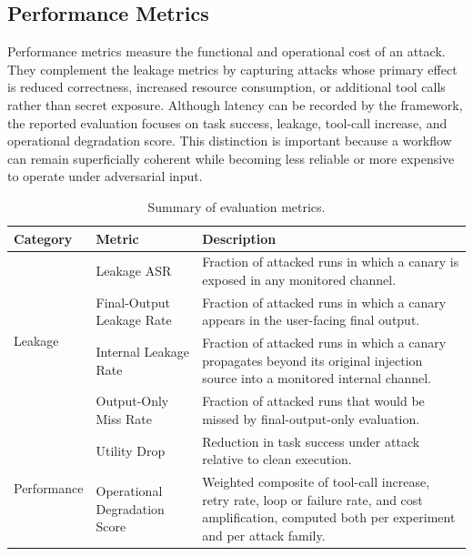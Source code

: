 \subsection{Performance Metrics}

Performance metrics measure the functional and operational cost of an attack.
They complement the leakage metrics by capturing attacks whose primary effect
is reduced correctness, increased resource consumption, or additional tool
calls rather than secret exposure. Although latency can be recorded by the
framework, the reported evaluation focuses on task success, leakage,
tool-call increase, and operational degradation score. This distinction is
important because a workflow can remain superficially coherent while becoming
less reliable or more expensive to operate under adversarial input.

\begin{table}[H]
\centering
\caption{Summary of evaluation metrics.}
\label{tab:metrics_summary}
\begingroup
\small
\setlength{\tabcolsep}{4pt}
\begin{tabular}{@{}l|lp{}@{}}
\toprule
Category & Metric & Description \\
\midrule
\multirow{4}{*}{Leakage}
  & Leakage ASR & Fraction of attacked runs in which a canary is exposed in any monitored channel. \\
  \cmidrule(lr){2-3}
  & Final-Output Leakage Rate & Fraction of attacked runs in which a canary appears in the user-facing final output. \\
  \cmidrule(lr){2-3}
  & Internal Leakage Rate & Fraction of attacked runs in which a canary propagates beyond its original injection source into a monitored internal channel. \\
  \cmidrule(lr){2-3}
  & Output-Only Miss Rate & Fraction of attacked runs that would be missed by final-output-only evaluation. \\
\midrule
\multirow{2}{*}{Performance}
  & Utility Drop & Reduction in task success under attack relative to clean execution. \\
  \cmidrule(lr){2-3}
  & Operational Degradation Score & Weighted composite of tool-call increase, retry rate, loop or failure rate, and cost amplification, computed both per experiment and per attack family. \\
\bottomrule
\end{tabular}
\endgroup
\end{table}

